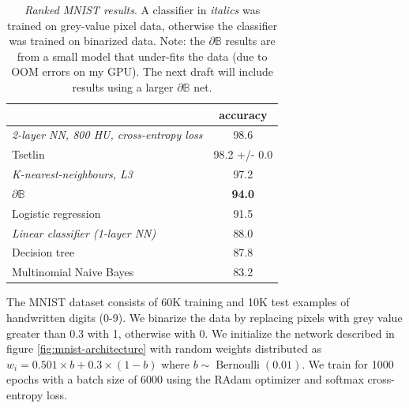 \documentclass{article} %
\begin{document}
\begin{table}[t]
	\centering
	\begin{tabular}{lc}
		\cline{2-2}
		& \textbf{accuracy}                  \\ \hline
		\multicolumn{1}{|l|}{\em 2-layer NN, 800 HU, cross-entropy loss} & \multicolumn{1}{c|}{98.6} \\ \hline
		\multicolumn{1}{|l|}{Tsetlin}                        & \multicolumn{1}{c|}{98.2 +/- 0.0}  \\ \hline
		\multicolumn{1}{|l|}{\em K-nearest-neighbours, L3}       & \multicolumn{1}{c|}{97.2}          \\ \hline
		\multicolumn{1}{|l|}{$\partial\mathbb{B}$}           & \multicolumn{1}{c|}{\textbf{94.0}} \\ \hline
		\multicolumn{1}{|l|}{Logistic regression}            & \multicolumn{1}{c|}{91.5}          \\ \hline
		\multicolumn{1}{|l|}{\em Linear classifier (1-layer NN)} & \multicolumn{1}{c|}{88.0}          \\ \hline
		\multicolumn{1}{|l|}{Decision tree}                  & \multicolumn{1}{c|}{87.8}          \\ \hline
		\multicolumn{1}{|l|}{Multinomial Naive Bayes}        & \multicolumn{1}{c|}{83.2}          \\ \hline
	\end{tabular}
	\caption{{\em Ranked MNIST results}. A classifier in {\em italics} was trained on grey-value pixel data, otherwise the classifier was trained on binarized data. Note: the $\partial\mathbb{B}$ results are from a small model that under-fits the data (due to OOM errors on my GPU). The next draft will include results using a larger $\partial\mathbb{B}$ net.}
	\label{tab:mnist-table}
\end{table}

The MNIST dataset \citep{726791} consists of 60K training and 10K test examples of handwritten digits (0-9). We binarize the data by replacing pixels with grey value greater than 0.3 with 1, otherwise with 0. We initialize the network described in figure \ref{fig:mnist-architecture} with random weights distributed as $w_{i} = 0.501 \times b + 0.3 \times (1-b)$ where $b \sim \operatorname{Bernoulli}(0.01)$. We train for 1000 epochs with a batch size of 6000 using the RAdam optimizer and softmax cross-entropy loss.
\end{document}
